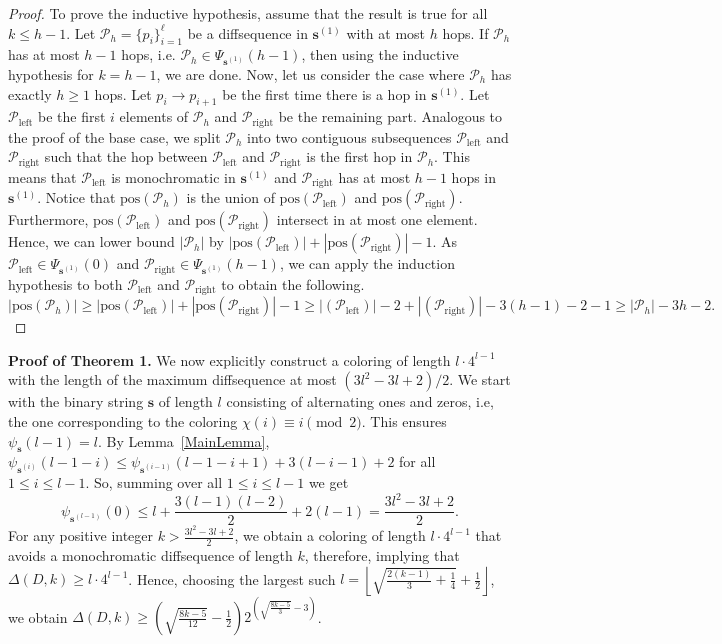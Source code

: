 \documentclass[10pt,a4paper]{amsart}
\begin{document}
\begin{proof}
To prove the inductive hypothesis, assume that the result is true for all $k\leq h-1$. Let $\mathcal{P}_h=\{p_i\}^\ell_{i=1}$ be a diffsequence in $\mathbf{s}^{(1)}$ with at most $h$ hops. If $\mathcal{P}_h$ has at most $h-1$ hops, i.e. $\mathcal{P}_h \in \Psi_{\mathbf{s}^{(1)}}(h-1)$, then using the inductive hypothesis for $k = h-1$, we are done. Now, let us consider the case where $\mathcal{P}_h$ has exactly $h \ge 1$ hops. Let $p_i\to p_{i+1}$ be the first time there is a hop in $\mathbf{s}^{(1)}$. Let $\mathcal{P}_{\text{left}}$ be the first $i$ elements of $\mathcal{P}_h$ and $\mathcal{P}_{\text{right}}$ be the remaining part. Analogous to the proof of the base case, we split $\mathcal{P}_h$ into two contiguous subsequences $\mathcal{P}_{\text{left}}$ and $\mathcal{P}_{\text{right}}$ such that the hop between $\mathcal{P}_{\text{left}}$ and $\mathcal{P}_{\text{right}}$ is the first hop in $\mathcal{P}_h$. This means that $\mathcal{P}_{\text{left}}$ is monochromatic in $\mathbf{s}^{(1)}$ and $\mathcal{P}_{\text{right}}$ has at most $h-1$ hops in $\mathbf{s}^{(1)}$. Notice that $\text{pos}(\mathcal{P}_h)$ is the union of $\text{pos}(\mathcal{P}_{\text{left}})$ and $\text{pos}(\mathcal{P}_{\text{right}})$. Furthermore, $\text{pos}(\mathcal{P}_{\text{left}})$ and $\text{pos}(\mathcal{P}_{\text{right}})$ intersect in at most one element. Hence, we can lower bound $|\mathcal{P}_h|$ by $|\text{pos}(\mathcal{P}_{\text{left}})|+|\text{pos}(\mathcal{P}_{\text{right}})|-1$. As $\mathcal{P}_{\text{left}}\in \Psi_{\mathbf{s}^{(1)}}(0)$ and $\mathcal{P}_{\text{right}}\in \Psi_{\mathbf{s}^{(1)}}(h-1)$, we can apply the induction hypothesis to both $\mathcal{P}_{\text{left}}$ and $\mathcal{P}_{\text{right}}$ to obtain the following. $|\text{pos}(\mathcal{P}_h)| \ge |\text{pos}(\mathcal{P}_{\text{left}})|+|\text{pos}(\mathcal{P}_{\text{right}})|-1 \ge |(\mathcal{P}_{\text{left}})|-2+|(\mathcal{P}_{\text{right}})|-3(h-1)-2-1 \ge |\mathcal{P}_h|-3h-2.$
\end{proof}

\noindent
\textbf{Proof of Theorem 1.} 
We now explicitly construct a coloring of length $l \cdot4^{l-1}$ with the length of the maximum diffsequence at most $(3l^2-3l+2)/2$. We start with the binary string $\mathbf{s}$ of length $l$ consisting of alternating ones and zeros, i.e, the one corresponding to the coloring $\chi(i)\equiv i\pmod{2}$. This ensures $\psi_{\mathbf{s}}(l-1)=l$. By Lemma~\ref{MainLemma}, $\psi_{\mathbf{s}^{(i)}}(l-1-i)\le \psi_{\mathbf{s}^{(i-1)}}(l-1-i+1)+3(l-i-1)+2$ for all $1\le i\le l-1$.
So, summing over all $1\le i\le l-1$ we get
\begin{equation*}
    \psi_{\mathbf{s}^{(l-1)}}(0)\le l+\frac{3(l-1)(l-2)}{2}+2(l-1)=\frac{3l^2-3l+2}{2}.
\end{equation*}
For any positive integer $k>\frac{3l^2-3l+2}{2}$, we obtain a coloring of length $l\cdot 4^{l-1}$ that avoids a monochromatic diffsequence of length $k$, therefore, implying that $\Delta(D,k)\ge l\cdot4^{l-1}$. Hence, choosing the largest such $l=\left\lfloor\sqrt{\frac{2(k-1)}{3}+\frac{1}{4}}+\frac{1}{2}\right\rfloor$, we obtain $\Delta(D,k)\ge\left(\sqrt{\frac{8k-5}{12}}-\frac12\right)2^{\left(\sqrt{\frac{8k-5}{3}}-3\right)}$.
\end{document}
